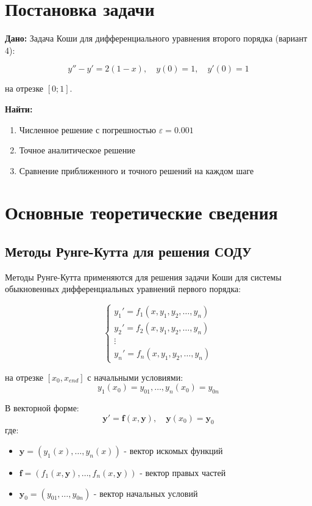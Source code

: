 \documentclass[a4paper, 14pt]{extarticle}
\begin{document}


\renewcommand{\ttdefault}{pcr}

\setlength{\tabcolsep}{3pt}



\newpage
\setcounter{page}{2}



\section{Постановка задачи}

\textbf{Дано:} Задача Коши для дифференциального уравнения второго порядка (вариант 4):

\[
y'' - y' = 2(1 - x), \quad y(0) = 1, \quad y'(0) = 1
\]

на отрезке $[0; 1]$.

\textbf{Найти:} 
\begin{enumerate}
\item Численное решение с погрешностью $\varepsilon = 0.001$
\item Точное аналитическое решение
\item Сравнение приближенного и точного решений на каждом шаге
\end{enumerate}

\section{Основные теоретические сведения}

\subsection{Методы Рунге-Кутта для решения СОДУ}
Методы Рунге-Кутта применяются для решения задачи Коши для системы обыкновенных дифференциальных уравнений первого порядка:

\[
\begin{cases}
y_1' = f_1(x, y_1, y_2, \ldots, y_n) \\
y_2' = f_2(x, y_1, y_2, \ldots, y_n) \\
\vdots \\
y_n' = f_n(x, y_1, y_2, \ldots, y_n)
\end{cases}
\]

на отрезке $[x_0, x_{end}]$ с начальными условиями:
\[
y_1(x_0) = y_{01}, \ldots, y_n(x_0) = y_{0n}
\]

В векторной форме:
\[
\mathbf{y}' = \mathbf{f}(x, \mathbf{y}), \quad \mathbf{y}(x_0) = \mathbf{y}_0
\]
где:
\begin{itemize}
\item $\mathbf{y} = (y_1(x), \ldots, y_n(x))$ - вектор искомых функций
\item $\mathbf{f} = (f_1(x, \mathbf{y}), \ldots, f_n(x, \mathbf{y}))$ - вектор правых частей
\item $\mathbf{y}_0 = (y_{01}, \ldots, y_{0n})$ - вектор начальных условий
\end{itemize}
\end{document}
